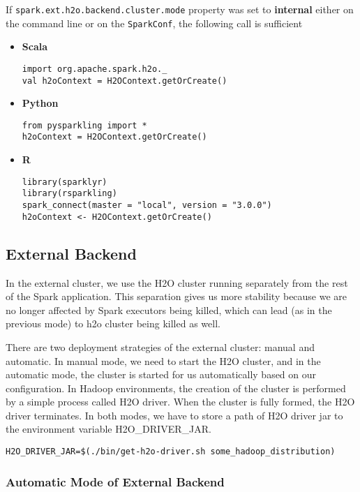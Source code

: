 If \texttt{spark.ext.h2o.backend.cluster.mode} property was set to \textbf{internal} either on the command line or
on the \texttt{SparkConf}, the following call is sufficient

\begin{itemize}
    \item \textbf{Scala} \begin{lstlisting}[style=Scala]
import org.apache.spark.h2o._
val h2oContext = H2OContext.getOrCreate()
    \end{lstlisting}
    \item \textbf{Python} \begin{lstlisting}[style=Python]
from pysparkling import *
h2oContext = H2OContext.getOrCreate()
    \end{lstlisting}
    \item \textbf{R} \begin{lstlisting}[style=R]
library(sparklyr)
library(rsparkling)
spark_connect(master = "local", version = "3.0.0")
h2oContext <- H2OContext.getOrCreate()
    \end{lstlisting}
\end{itemize}

\subsection{External Backend}

In the external cluster, we use the H2O cluster running separately from the rest of the Spark application. This separation
gives us more stability because we are no longer affected by Spark executors being killed, which can
lead (as in the previous mode) to h2o cluster being killed as well.

There are two deployment strategies of the external cluster: manual and automatic. In manual mode, we need to start
the H2O cluster, and in the automatic mode, the cluster is started for us automatically based on our configuration.
In Hadoop environments, the creation of the cluster is performed by a simple process called H2O driver.
When the cluster is fully formed, the H2O driver terminates. In both modes, we have to store a path of H2O driver jar
to the environment variable H2O\_DRIVER\_JAR.

\begin{lstlisting}[style=bash]
H2O_DRIVER_JAR=$(./bin/get-h2o-driver.sh some_hadoop_distribution)
\end{lstlisting}

\subsubsection{Automatic Mode of External Backend}

